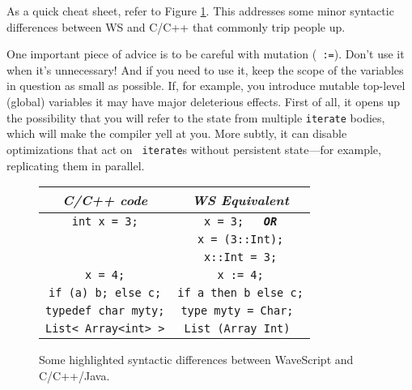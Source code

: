 \documentclass[twocolumn]{report}
\begin{document}
As a quick cheat sheet, refer to Figure \ref{f:cprogrammertips}.  This
addresses some minor syntactic differences between WS and C/C++ that
commonly trip people up.

One important piece of advice is to be careful with mutation ({\tt
  :=}).  Don't use it when it's unnecessary!  And if you need to use
  it, keep the scope of the variables in question as small as
  possible.  If, for example, you introduce mutable top-level (global)
  variables it may have major deleterious effects.  First of all, it
  opens up the possibility that you will refer to the state from
  multiple {\tt iterate} bodies, which will make the compiler yell at
  you.  More subtly, it can disable optimizations that act on {\tt
  iterate}s without persistent state---for example, replicating them
  in parallel.

\begin{figure}
\begin{center}
\begin{tabular}{|c|c|}
\hline {\em C/C++ code} & {\em WS Equivalent} \\
\hline
{\tt int x = 3;} & {\tt x = 3;     \ \ {\bf \em OR}}   \\
{\tt } & {\tt x = (3::Int);}  \\
{\tt } & {\tt x::Int = 3;}    \\
\hline
{\tt x = 4;}            & {\tt x := 4;} \\ 
\hline
{\tt if (a) b; else c;} & {\tt if a then b else c;} \\  \hline
{\tt typedef char myty;} & {\tt type myty = Char; } \\  \hline

{\tt List< Array<int> >}          & {\tt List (Array Int) } \\  \hline
\end{tabular}
\end{center}
\caption{Some highlighted syntactic differences between WaveScript and C/C++/Java.}
\label{f:cprogrammertips}
\end{figure}




\end{document}
